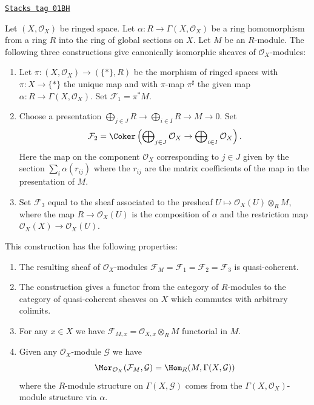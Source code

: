 \begin{lemma}
\label{modules-lemma-construct-quasi-coherent-sheaves}
\href{https://stacks.math.columbia.edu/tag/01BH}{\texttt{Stacks tag 01BH}}

Let $(X, \mathcal{O}_X)$ be ringed space.
Let $\alpha : R \to \Gamma(X, \mathcal{O}_X)$ be a ring homomorphism from
a ring $R$ into the ring of global sections on $X$.
Let $M$ be an $R$-module.
The following three constructions give canonically isomorphic
sheaves of $\mathcal{O}_X$-modules:
\begin{enumerate}
\item Let $\pi : (X, \mathcal{O}_X) \longrightarrow (\{*\}, R)$
be the morphism of ringed spaces with $\pi : X \to \{*\}$
the unique map and with $\pi$-map $\pi^\sharp$ the given map
$\alpha : R \to \Gamma(X, \mathcal{O}_X)$. Set $\mathcal{F}_1 = \pi^*M$.
\item Choose a presentation
$\bigoplus_{j \in J} R \to \bigoplus_{i \in I} R \to M \to 0$.
Set
$$
\mathcal{F}_2 = \Coker\left(
\bigoplus\nolimits_{j \in J} \mathcal{O}_X
\to
\bigoplus\nolimits_{i \in I} \mathcal{O}_X
\right).
$$
Here the map on the component $\mathcal{O}_X$ corresponding to $j \in J$
given by the section $\sum_i \alpha(r_{ij})$ where the $r_{ij}$
are the matrix coefficients of the map in the presentation of $M$.
\item Set $\mathcal{F}_3$ equal to the sheaf associated to the presheaf
$U \mapsto \mathcal{O}_X(U) \otimes_R M$, where the map
$R \to \mathcal{O}_X(U)$ is the composition of $\alpha$ and
the restriction map $\mathcal{O}_X(X) \to \mathcal{O}_X(U)$.
\end{enumerate}
This construction has the following properties:
\begin{enumerate}
\item The resulting sheaf of $\mathcal{O}_X$-modules
$\mathcal{F}_M = \mathcal{F}_1 = \mathcal{F}_2 = \mathcal{F}_3$
is quasi-coherent.
\item The construction gives a functor from
the category of $R$-modules to the category of quasi-coherent
sheaves on $X$ which commutes with arbitrary colimits.
\item For any $x \in X$ we have
$\mathcal{F}_{M, x} = \mathcal{O}_{X, x} \otimes_R M$
functorial in $M$.
\item Given any $\mathcal{O}_X$-module
$\mathcal{G}$ we have
$$
\Mor_{\mathcal{O}_X}(\mathcal{F}_M, \mathcal{G})
=
\Hom_R(M, \Gamma(X, \mathcal{G}))
$$
where the $R$-module structure on $\Gamma(X, \mathcal{G})$
comes from the $\Gamma(X, \mathcal{O}_X)$-module structure via
$\alpha$.
\end{enumerate}
\end{lemma}

